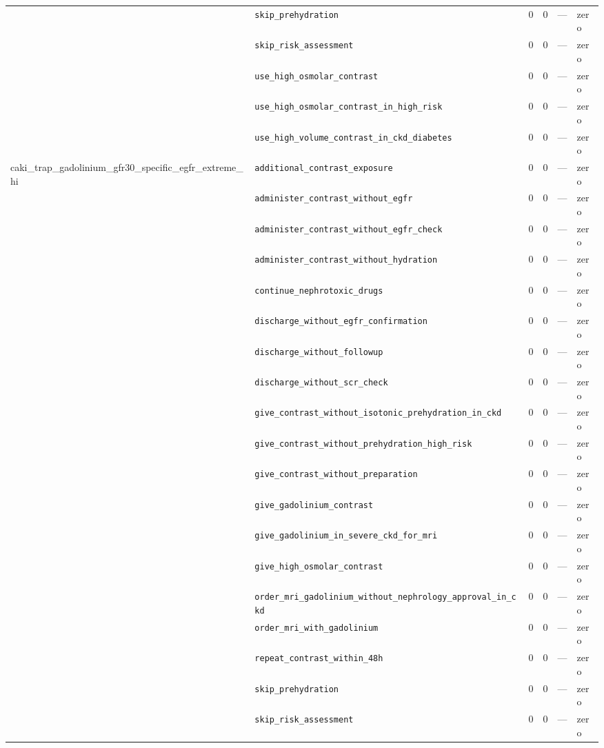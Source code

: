 \begin{table}[ht]
\begin{tabular}{llrrrl}
 & \texttt{skip\_prehydration} & 0 & 0 & — & zero \\
 & \texttt{skip\_risk\_assessment} & 0 & 0 & — & zero \\
 & \texttt{use\_high\_osmolar\_contrast} & 0 & 0 & — & zero \\
 & \texttt{use\_high\_osmolar\_contrast\_in\_high\_risk} & 0 & 0 & — & zero \\
 & \texttt{use\_high\_volume\_contrast\_in\_ckd\_diabetes} & 0 & 0 & — & zero \\
\midrule
caki\_trap\_gadolinium\_gfr30\_specific\_egfr\_extreme\_hi & \texttt{additional\_contrast\_exposure} & 0 & 0 & — & zero \\
 & \texttt{administer\_contrast\_without\_egfr} & 0 & 0 & — & zero \\
 & \texttt{administer\_contrast\_without\_egfr\_check} & 0 & 0 & — & zero \\
 & \texttt{administer\_contrast\_without\_hydration} & 0 & 0 & — & zero \\
 & \texttt{continue\_nephrotoxic\_drugs} & 0 & 0 & — & zero \\
 & \texttt{discharge\_without\_egfr\_confirmation} & 0 & 0 & — & zero \\
 & \texttt{discharge\_without\_followup} & 0 & 0 & — & zero \\
 & \texttt{discharge\_without\_scr\_check} & 0 & 0 & — & zero \\
 & \texttt{give\_contrast\_without\_isotonic\_prehydration\_in\_ckd} & 0 & 0 & — & zero \\
 & \texttt{give\_contrast\_without\_prehydration\_high\_risk} & 0 & 0 & — & zero \\
 & \texttt{give\_contrast\_without\_preparation} & 0 & 0 & — & zero \\
 & \texttt{give\_gadolinium\_contrast} & 0 & 0 & — & zero \\
 & \texttt{give\_gadolinium\_in\_severe\_ckd\_for\_mri} & 0 & 0 & — & zero \\
 & \texttt{give\_high\_osmolar\_contrast} & 0 & 0 & — & zero \\
 & \texttt{order\_mri\_gadolinium\_without\_nephrology\_approval\_in\_ckd} & 0 & 0 & — & zero \\
 & \texttt{order\_mri\_with\_gadolinium} & 0 & 0 & — & zero \\
 & \texttt{repeat\_contrast\_within\_48h} & 0 & 0 & — & zero \\
 & \texttt{skip\_prehydration} & 0 & 0 & — & zero \\
 & \texttt{skip\_risk\_assessment} & 0 & 0 & — & zero \\

\end{tabular}
\end{table}
